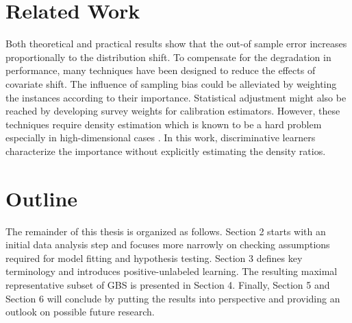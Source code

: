 \section{Related Work}

Both theoretical and practical results show that the out-of sample error increases proportionally to the distribution shift. To compensate for the degradation in performance, many techniques have been designed to reduce the effects of covariate shift. The influence of sampling bias could be alleviated by weighting the instances according to their importance. Statistical adjustment might also be reached by developing survey weights for calibration estimators. However, these techniques require density estimation which is known to be a hard problem especially in high-dimensional cases \cite{jean, shimodaira, brick}. In this work, discriminative learners characterize the importance without explicitly estimating the density ratios.

\section{Outline}

The remainder of this thesis is organized as follows. Section 2 starts with an initial data analysis step and focuses more narrowly on checking assumptions required for model fitting and hypothesis testing. Section 3 defines key terminology and introduces positive-unlabeled learning. The resulting maximal representative subset of GBS is presented in Section 4. Finally, Section 5 and Section 6 will conclude by putting the results into perspective and providing an outlook on possible future research.